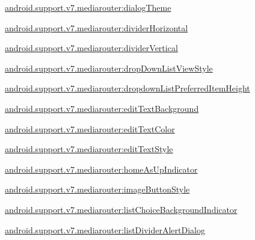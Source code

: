 {\ttfamily \hyperlink{classandroid_1_1support_1_1v7_1_1mediarouter_1_1R_1_1styleable_ae5022810b719a59e28a020ed0d2689d1}{android.\+support.\+v7.\+mediarouter\+:dialog\+Theme}}

{\ttfamily \hyperlink{classandroid_1_1support_1_1v7_1_1mediarouter_1_1R_1_1styleable_af1934692686e513b4d05797f7f21f7c8}{android.\+support.\+v7.\+mediarouter\+:divider\+Horizontal}}

{\ttfamily \hyperlink{classandroid_1_1support_1_1v7_1_1mediarouter_1_1R_1_1styleable_af04d015bffeaa6e33a461f5976092ee7}{android.\+support.\+v7.\+mediarouter\+:divider\+Vertical}}

{\ttfamily \hyperlink{classandroid_1_1support_1_1v7_1_1mediarouter_1_1R_1_1styleable_a63a97be975b87c1a0d46a0ace55382ec}{android.\+support.\+v7.\+mediarouter\+:drop\+Down\+List\+View\+Style}}

{\ttfamily \hyperlink{classandroid_1_1support_1_1v7_1_1mediarouter_1_1R_1_1styleable_a3a6ed7fa586db357c9b5385ac2be0ddf}{android.\+support.\+v7.\+mediarouter\+:dropdown\+List\+Preferred\+Item\+Height}}

{\ttfamily \hyperlink{classandroid_1_1support_1_1v7_1_1mediarouter_1_1R_1_1styleable_a6fda1fd04dd1db6ea57c92f5116e4ccb}{android.\+support.\+v7.\+mediarouter\+:edit\+Text\+Background}}

{\ttfamily \hyperlink{classandroid_1_1support_1_1v7_1_1mediarouter_1_1R_1_1styleable_a24e96622e17c6e06f00fb84f96e4c62b}{android.\+support.\+v7.\+mediarouter\+:edit\+Text\+Color}}

{\ttfamily \hyperlink{classandroid_1_1support_1_1v7_1_1mediarouter_1_1R_1_1styleable_a397e422b63e3ca3295e55fd0a548cd24}{android.\+support.\+v7.\+mediarouter\+:edit\+Text\+Style}}

{\ttfamily \hyperlink{classandroid_1_1support_1_1v7_1_1mediarouter_1_1R_1_1styleable_a1ce96df8d4a5f00bdb41453b81f64749}{android.\+support.\+v7.\+mediarouter\+:home\+As\+Up\+Indicator}}

{\ttfamily \hyperlink{classandroid_1_1support_1_1v7_1_1mediarouter_1_1R_1_1styleable_a9168d9e2a7a62b5b606d8a6429c93118}{android.\+support.\+v7.\+mediarouter\+:image\+Button\+Style}}

{\ttfamily \hyperlink{classandroid_1_1support_1_1v7_1_1mediarouter_1_1R_1_1styleable_a0231c101569fa781bb9a5ecba4ff728f}{android.\+support.\+v7.\+mediarouter\+:list\+Choice\+Background\+Indicator}}

{\ttfamily \hyperlink{classandroid_1_1support_1_1v7_1_1mediarouter_1_1R_1_1styleable_ac591345fbb2242bdd017831f3945bb54}{android.\+support.\+v7.\+mediarouter\+:list\+Divider\+Alert\+Dialog}}

